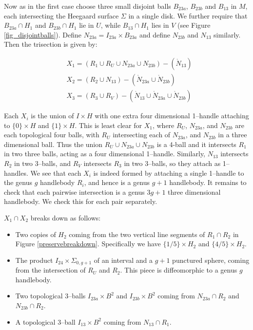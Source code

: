 \documentclass[12pt]{amsart}
\theoremstyle{definition}
\theoremstyle{remark}
\begin{document}
Now as in the first case choose three small disjoint balls $B_{23a}$, $B_{23b}$ and $B_{13}$ in $M$, each intersecting the Heegaard surface $\Sigma$ in a single disk.
We further require that $B_{23a} \cap H_1$ and $B_{23b} \cap H_1$ lie in $U$, while $B_{13} \cap H_1$ lies in $V$ (see Figure \ref{fig_disjointballs}).
Define $N_{23a} = I_{23a} \times B_{23a}$ and define $N_{23b}$ and $N_{13}$ similarly.
Then the trisection is given by:

\begin{align*}
&X_1 = (R_1 \cup R_U \cup N_{23a} \cup N_{23b}) - (\mathring N_{13}) \\
&X_2 = (R_2 \cup N_{13}) - (\mathring N_{23a} \cup \mathring N_{23b}) \\
&X_3 = (R_3 \cup R_V) - (\mathring N_{13} \cup \mathring N_{23a} \cup \mathring N_{23b})
\end{align*}

Each $X_i$ is the union of $I \times H$ with one extra four dimensional 1--handle attaching to $\{0\} \times H$ and $\{1\} \times H$.
This is least clear for $X_1$, where $R_U$, $N_{23a}$, and $N_{23b}$ are each topological four balls, with $R_U$ intersecting each of $N_{23a}$, and $N_{23b}$ in a three dimensional ball.
Thus the union $R_U \cup N_{23a} \cup N_{23b}$ is a 4-ball and it intersects $R_1$ in two three balls, acting as a four dimensional 1--handle.
Similarly, $N_{13}$ intersects $R_2$ in two 3--balls, and $R_V$ intersects $R_3$ in two 3--balls, so they attach as 1--handles.
 We see that each $X_i$ is indeed formed by attaching a single 1--handle to the genus $g$ handlebody $R_i$, and hence is a genus $g+1$ handlebody.
It remains to check that each pairwise intersection is a genus $3g+1$ three dimensional handlebody.
We check this for each pair separately.

$X_1 \cap X_2$ breaks down as follows:

\begin{itemize}
\item Two copies of $H_2$ coming from the two vertical line segments of $R_1 \cap R_2$ in Figure \ref{preservebreakdown}.
Specifically we have $\{1/5\} \times H_2$ and $\{4/5\} \times H_2$.
\item The product $I_{24} \times \Sigma_{0,g+1}$ of an interval and a $g+1$ punctured sphere, coming from the intersection of $R_U$ and $R_2$.
This piece is diffeomorphic to a genus $g$ handlebody.
\item Two topological 3--balls $I_{23a} \times B^2$ and $I_{23b} \times B^2$ coming from $N_{23a} \cap R_2$ and $N_{23b} \cap R_2$.
\item A topological 3--ball $I_{13} \times B^2$ coming from $N_{13} \cap R_1$.
\end{itemize}
\end{document}
